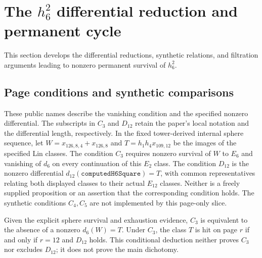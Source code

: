 \section{The $h_6^2$ differential reduction and permanent cycle}
\label{chap:near126}

This section develops the differential reductions, synthetic relations, and
filtration arguments leading to nonzero permanent survival of $h_6^2$.

\subsection{Page conditions and synthetic comparisons}

\begin{definition}
  \label{def:near126-fixed-page-conditions}
  \notready
  These public names describe the vanishing condition and the specified
  nonzero differential. The subscripts in $C_3$ and $D_{12}$ retain the
  paper's local notation and the differential length, respectively.
  In the fixed tower-derived internal sphere sequence, let
  $W=x_{126,8,4}+x_{126,8}$ and $T=h_1h_4x_{109,12}$ be the images of the
  specified Lin classes.  The condition $C_3$ requires nonzero survival of
  $W$ to $E_6$ and vanishing of $d_6$ on every continuation of this $E_2$
  class.  The condition $D_{12}$ is the nonzero differential
  $d_{12}(\mathtt{computedH6Square})=T$, with common representatives relating
  both displayed classes to their actual $E_{12}$ classes.
  Neither is a freely supplied proposition or an assertion that the
  corresponding condition holds.  The synthetic conditions $C_4,C_5$ are
  not implemented by this page-only slice.
\end{definition}

\begin{lemma}
  \label{lem:near126-fixed-c3-incoming}
  \notready
  Given the explicit sphere survival and exhaustion evidence,
  $C_3$ is equivalent to the absence of a nonzero $d_6(W)=T$.
  Under $C_3$, the class $T$ is hit on page $r$ if and only if
  $r=12$ and $D_{12}$ holds.  This conditional deduction neither proves
  $C_3$ nor excludes $D_{12}$; it does not prove the main dichotomy.
\end{lemma}

